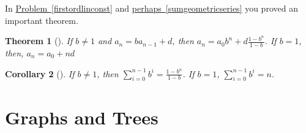 \documentclass[10pt,]{book}
\theoremstyle{plain}
\newtheorem{theorem}{Theorem}[section]
\newtheorem{corollary}[theorem]{Corollary}
\theoremstyle{definition}
\numberwithin{equation}{chapter}
\begin{document}
In \hyperref[firstordlinconst]{Problem~\ref{firstordlinconst}} and \hyperref[sumgeometricseries]{perhaps~\ref{sumgeometricseries}} you proved an important theorem.%
\begin{theorem}[{}]\label{theorem-2}
If \(b\not=1\) and \(a_n=ba_{n-1} +d\), then \(\displaystyle a_n =
a_0b^n + d\frac{1-b^n}{1-b}\). If \(b=1\), then, \(\displaystyle a_n =
a_0 +nd\)%
\end{theorem}
\begin{corollary}[{}]\label{corollary-1}
If \(b\not=1\), then \(\displaystyle \sum_{i=0}^{n-1}b^i =
\frac{1-b^n}{1-b}\). If \(b=1\), \(\displaystyle \sum_{i=0}^{n-1}b^i =n\).%
\end{corollary}
\typeout{************************************************}
\typeout{************************************************}
\section[{Graphs and Trees}]{Graphs and Trees}\label{sec_induction-graphstrees}
\typeout{************************************************}
\typeout{************************************************}
\end{document}
